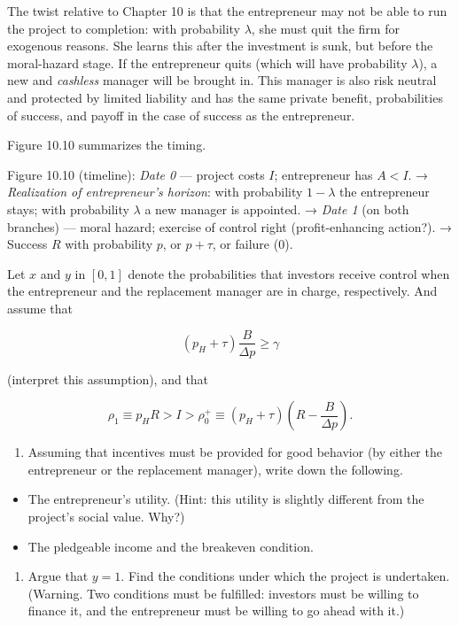 \documentclass[11pt,a4paper]{article}
\providecommand{\tightlist}{\setlength{\itemsep}{0pt}\setlength{\parskip}{0pt}}
\begin{document}
The twist relative to Chapter 10 is that the entrepreneur may not be able to run the project to
completion: with probability \(\lambda\), she must quit the firm for exogenous reasons. She learns
this after the investment is sunk, but before the moral-hazard stage. If the entrepreneur quits
(which will have probability \(\lambda\)), a new and \emph{cashless} manager will be brought in.
This manager is also risk neutral and protected by limited liability and has the same private
benefit, probabilities of success, and payoff in the case of success as the entrepreneur.

Figure 10.10 summarizes the timing.

Figure 10.10 (timeline): \emph{Date 0} --- project costs \(I\); entrepreneur has \(A < I\). →
\emph{Realization of entrepreneur's horizon}: with probability \(1 - \lambda\) the entrepreneur
stays; with probability \(\lambda\) a new manager is appointed. → \emph{Date 1} (on both branches)
--- moral hazard; exercise of control right (profit-enhancing action?). → Success \(R\) with
probability \(p\), or \(p + \tau\), or failure (0).

Let \(x\) and \(y\) in \([0, 1]\) denote the probabilities that investors receive control when the
entrepreneur and the replacement manager are in charge, respectively. And assume that

\[(p_H + \tau)\frac{B}{\Delta p} \geqslant \gamma\]

(interpret this assumption), and that

\[\rho_1 \equiv p_H R > I > \rho_0^+ \equiv (p_H + \tau)\left(R - \frac{B}{\Delta p}\right).\]

\begin{enumerate}
\def\labelenumi{(\roman{enumi})}
\tightlist
\item
  Assuming that incentives must be provided for good behavior (by either the entrepreneur or the
  replacement manager), write down the following.
\end{enumerate}

\begin{itemize}
\tightlist
\item
  The entrepreneur's utility. (Hint: this utility is slightly different from the project's social
  value. Why?)
\item
  The pledgeable income and the breakeven condition.
\end{itemize}

\begin{enumerate}
\def\labelenumi{(\roman{enumi})}
\setcounter{enumi}{1}
\tightlist
\item
  Argue that \(y = 1\). Find the conditions under which the project is undertaken. (Warning. Two
  conditions must be fulfilled: investors must be willing to finance it, and the entrepreneur must
  be willing to go ahead with it.)
\end{enumerate}
\end{document}
